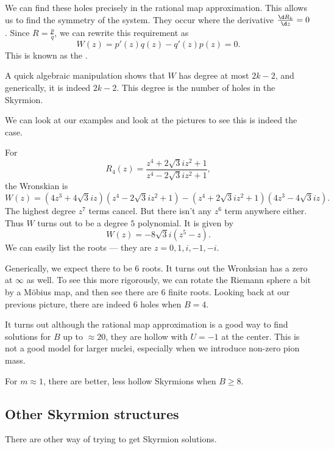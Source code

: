 \documentclass[a4paper]{article}
\begin{document}
We can find these holes precisely in the rational map approximation. This allows us to find the symmetry of the system. They occur where the derivative $\frac{\d R_k}{\d z} = 0$. Since $R = \frac{p}{q}$, we can rewrite this requirement as
\[
  W(z) = p'(z) q(z) - q'(z) p(z) = 0.
\]
This is known as the .

A quick algebraic manipulation shows that $W$ has degree at most $2k - 2$, and generically, it is indeed $2k - 2$. This degree is the number of holes in the Skyrmion.

We can look at our examples and look at the pictures to see this is indeed the case.

\begin{eg}
  For
  \[
    R_4(z) = \frac{z^4 + 2\sqrt{3} i z^2 + 1}{z^4 - 2\sqrt{3} i z^2 + 1},
  \]
  the Wronskian is
  \[
    W(z) = (4z^3 + 4 \sqrt{3}i z)(z^4 - 2\sqrt{3} i z^2 + 1) - (z^4 + 2 \sqrt{3} i z^2 + 1) (4z^3 - 4 \sqrt{3} i z).
  \]
  The highest degree $z^7$ terms cancel. But there isn't any $z^6$ term anywhere either. Thus $W$ turns out to be a degree $5$ polynomial. It is given by
  \[
    W(z) = - 8 \sqrt{3}i (z^5 - z).
  \]
  We can easily list the roots --- they are $z = 0, 1, i, -1, -i$.

  Generically, we expect there to be $6$ roots. It turns out the Wronksian has a zero at $\infty$ as well. To see this more rigorously, we can rotate the Riemann sphere a bit by a M\"obius map, and then see there are $6$ finite roots. Looking back at our previous picture, there are indeed $6$ holes when $B = 4$.
\end{eg}



It turns out although the rational map approximation is a good way to find solutions for $B$ up to $\approx 20$, they are hollow with $U = -1$ at the center. This is not a good model for larger nuclei, especially when we introduce non-zero pion mass.

For $m \approx 1$, there are better, less hollow Skyrmions when $B \geq 8$.

\subsection{Other Skyrmion structures}
There are other way of trying to get Skyrmion solutions.
\end{document}
